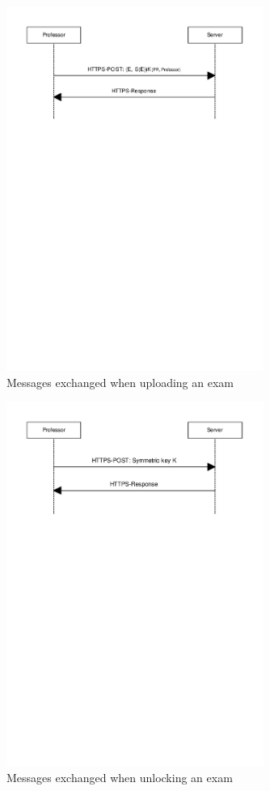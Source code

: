 \documentclass{article}
\begin{document}
\begin{figure}
\begin{center}
\includegraphics[width=0.75\textwidth]{images/upload_exam.pdf}
\caption{Messages exchanged when uploading an exam}
\label{fig:upload)exam}
\end{center}
\end{figure}

\begin{figure}
\begin{center}
\includegraphics[width=0.75\textwidth]{images/unlock_exam.pdf}
\caption{Messages exchanged when unlocking an exam}
\label{fig:unlock-exam}
\end{center}
\end{figure}
\end{document}
